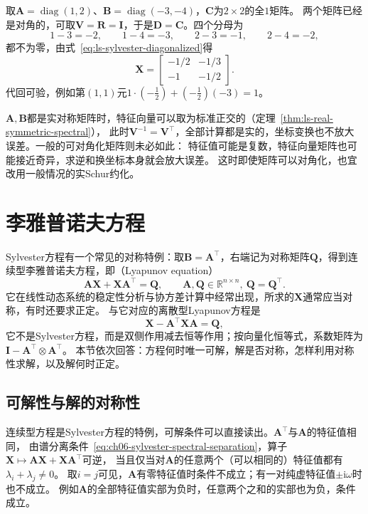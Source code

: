 \begin{example}[对角Sylvester方程的闭式解]
\label{ex:ls-sylvester-diagonal}
取$\bm A=\operatorname{diag}(1,2)$、$\bm B=\operatorname{diag}(-3,-4)$，$\bm C$为$2\times2$的全$1$矩阵。
两个矩阵已经是对角的，可取$\bm V=\bm R=\bm I$，于是$\bm D=\bm C$。四个分母为
\[
 1-3=-2,\qquad 1-4=-3,\qquad 2-3=-1,\qquad 2-4=-2,
\]
都不为零，由式~\eqref{eq:ls-sylvester-diagonalized}得
\[
 \bm X=\begin{bmatrix}-1/2&-1/3\\-1&-1/2\end{bmatrix}.
\]
代回可验，例如第$(1,1)$元$1\cdot(-\tfrac12)+(-\tfrac12)(-3)=1$。
\end{example}

$\bm A,\bm B$都是实对称矩阵时，特征向量可以取为标准正交的（定理~\ref{thm:ls-real-symmetric-spectral}），
此时$\bm V^{-1}=\bm V^\top$，全部计算都是实的，坐标变换也不放大误差。一般的可对角化矩阵则未必如此：
特征值可能是复数，特征向量矩阵也可能接近奇异，求逆和换坐标本身就会放大误差。
这时即使矩阵可以对角化，也宜改用一般情况的实Schur约化。

\section{李雅普诺夫方程}
\label{sec:ls-lyapunov}

Sylvester方程有一个常见的对称特例：取$\bm B=\bm A^\top$，右端记为对称矩阵$\bm Q$，得到连续型李雅普诺夫方程，即（Lyapunov equation）
\[
 \bm A\bm X+\bm X\bm A^\top=\bm Q ,\qquad \bm A,\bm Q\in\mathbb R^{n\times n},\ \bm Q=\bm Q^\top .
\]
它在线性动态系统的稳定性分析与协方差计算中经常出现，所求的$\bm X$通常应当对称，有时还要求正定。
与它对应的离散型Lyapunov方程是
\[
 \bm X-\bm A^\top\bm X\bm A=\bm Q ,
\]
它不是Sylvester方程，而是双侧作用减去恒等作用；按向量化恒等式，系数矩阵为$\bm I-\bm A^\top\otimes\bm A^\top$。
本节依次回答：方程何时唯一可解，解是否对称，怎样利用对称性求解，以及解何时正定。

\subsection{可解性与解的对称性}
\label{sec:ls-lyapunov-solvability}

连续型方程是Sylvester方程的特例，可解条件可以直接读出。$\bm A^\top$与$\bm A$的特征值相同，
由谱分离条件~\eqref{eq:ch06-sylvester-spectral-separation}，算子$\bm X\mapsto\bm A\bm X+\bm X\bm A^\top$可逆，
当且仅当对$\bm A$的任意两个（可以相同的）特征值都有$\lambda_i+\lambda_j\neq0$。
取$i=j$可见，$\bm A$有零特征值时条件不成立；有一对纯虚特征值$\pm\mathrm i\omega$时也不成立。
例如$\bm A$的全部特征值实部为负时，任意两个之和的实部也为负，条件成立。

